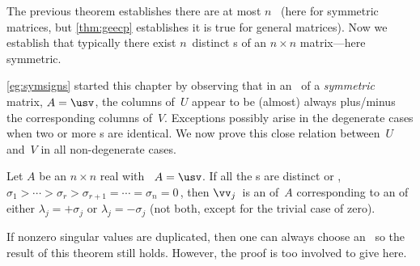 The previous theorem establishes there are at most \(n\)~ (here for symmetric matrices, but \autoref{thm:geecp} establishes it is true for general matrices).  
Now we establish that typically there exist \(n\)~distinct s of an \(n\times n\) matrix---here symmetric.

\begin{comment}
The problem case of repeated singular values and repeated eigenvalues appears to be not adequately dealt with by any first textbook that I have read.
\pooliv{p.294} discusses algebraic and geometric {multiplicity}, but best left for eigen-problem of general matrices, if necessary.
\end{comment}



\autoref{eg:symsigns} started this chapter by observing that in an \svd\ of a \emph{symmetric} matrix, \(A=\usv\), the columns of~\(U\) appear to be (almost) always plus\slash minus the corresponding columns of~\(V\).
Exceptions possibly arise in the degenerate cases when two or more s are identical.
We now prove this close relation between~\(U\) and~\(V\) in all non-degenerate cases.


\begin{theorem} \label{thm:smevec}
Let \(A\) be an \(n\times n\) real  with \svd\ \(A=\usv\).
If all the s are distinct or , \(\sigma_1>\cdots>\sigma_r>\sigma_{r+1}=\cdots=\sigma_n=0\)\,, then \(\vv_j\)~is an  of~\(A\) corresponding to an  of either \(\lambda_j=+\sigma_j\) or \(\lambda_j=-\sigma_j\) (not both, except for the trivial case of zero).
\end{theorem}

If nonzero singular values are duplicated, then one can always choose an \svd\ so the result of this theorem still holds.
However, the proof is too involved to give here.


